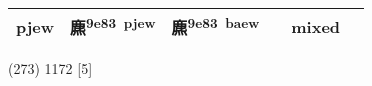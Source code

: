 \documentclass[14pt,a4paper]{scrartcl}
\begin{document}
\begin{longtable}[c]{@{}llllll@{}}
\begin{minipage}[t]{0.14\columnwidth}
pjew
\strut\end{minipage} &
\begin{minipage}[t]{0.14\columnwidth}\raggedright\strut
麃\textsuperscript{9e83~pjew}
\strut\end{minipage} &
\begin{minipage}[t]{0.14\columnwidth}\raggedright\strut
麃\textsuperscript{9e83~baew}
\strut\end{minipage} &
\begin{minipage}[t]{0.14\columnwidth}\raggedright\strut
\strut\end{minipage} &
\begin{minipage}[t]{0.14\columnwidth}\raggedright\strut
mixed
\strut\end{minipage}\tabularnewline
\bottomrule
\end{longtable}

(273) 1172 {[}5{]}
\end{document}
